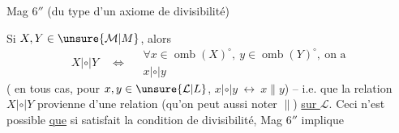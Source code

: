 Mag $6''$ (du type d'un axiome de divisibilité)

Si $X,Y\in\unsure{\mathcal M|M}$, alors
\[
X\mathrel{|\circ|}Y\quad\Longleftrightarrow\quad
\begin{gathered}
\forall x\in\operatorname{omb}(X)^{\circ},\ y\in\operatorname{omb}(Y)^{\circ},\ \text{on a}\\
x\mathrel{|\circ|}y
\end{gathered}
\tag*{(***)}
\]
( en tous cas, pour $x,y\in\unsure{\mathcal L|L}$, $x\mathrel{|\circ|}y\ \longleftrightarrow\ x\parallel y$) -- i.e. que la relation $X\mathrel{|\circ|}Y$ provienne d'une relation (qu'on peut aussi noter $\parallel$) \uline{sur $\mathcal L$}. Ceci n'est possible \uline{que} si  satisfait la condition de divisibilité,  Mag $6''$ implique
